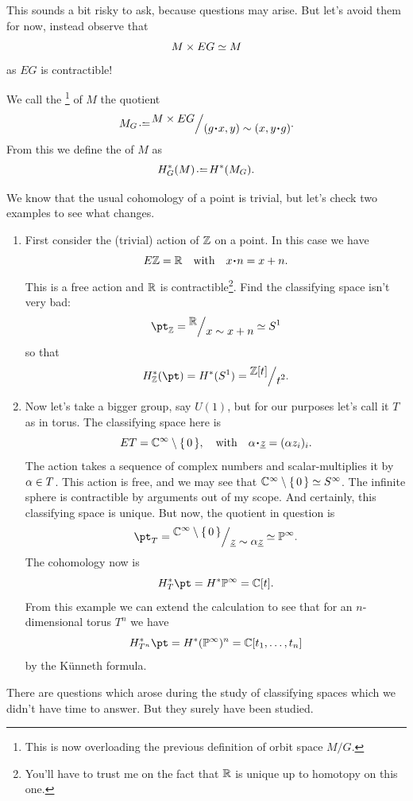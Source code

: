 \documentclass[12pt]{memoir}
\begin{document}
This sounds a bit risky to ask, because questions may arise. But let's avoid them for now, instead observe that 
$$M\times EG\simeq M$$
as $EG$ is contractible! 

\begin{Def}
    We call the \footnote{This is now overloading the previous definition of orbit space $M/G$.} of $M$ the quotient
    $$M_G\defeq\quot{M\x EG}{(g\.x,y)\sim(x,y\.g)}.$$
    From this we define the  of $M$ as 
    $$H_G^\ast(M)\defeq H^\ast(M_G).$$
\end{Def}

\begin{Ex}
We know that the usual cohomology of a point is trivial, but let's check two examples to see what changes.
\begin{enumerate}
    \item First consider the (trivial) action of $\mathbb{Z}$ on a point. In this case we have
    $$E\bZ=\bR\word{with}x\.n=x+n.$$
    This is a free action and $\mathbb{R}$ is contractible\footnote{You'll have to trust me on the fact that $\mathbb{R}$ is unique up to homotopy on this one.}. Find the classifying space isn't very bad:
    $$\pt_\bZ=\quot{\bR}{x\sim x+n}\isom S^1$$
    so that 
    $$H_\bZ^\ast(\pt)=H^\ast(S^1)=\quot{\bZ[t]}{t^2}.$$
    \item Now let's take a bigger group, say $U(1)$, but for our purposes let's call it $T$ as in torus. The classifying space here is 
    $$ET=\bC^\infty\less\set{0},\word{with}\al\.\un{z}=(\al z_i)_i.$$
    The action takes a sequence of complex numbers and scalar-multiplies it by $\alpha\in T$. 
    This action is free, and we may see that $\mathbb{C}^\infty\setminus\{\,0\,\}\simeq S^\infty$. The infinite sphere is contractible by arguments out of my scope. And certainly, this classifying space is unique. But now, the quotient in question is 
    $$\pt_T=\quot{\bC^\infty\less\set{0}}{\un{z}\sim \al\un{z}}\isom\bP^\infty.$$
    The cohomology now is 
    $$H^\ast_{T}\pt=H^\ast\bP^\infty=\bC[t].$$
    From this example we can extend the calculation to see that for an $n$-dimensional torus $T^n$ we have 
    $$H^\ast_{T^n}\pt=H^\ast(\bP^\infty)^n=\bC[t_1,\dots,t_n]$$
    by the K\"unneth formula.
\end{enumerate}
\end{Ex}

There are questions which arose during the study of classifying spaces which we didn't have time to answer. But they surely have been studied.
\end{document}
